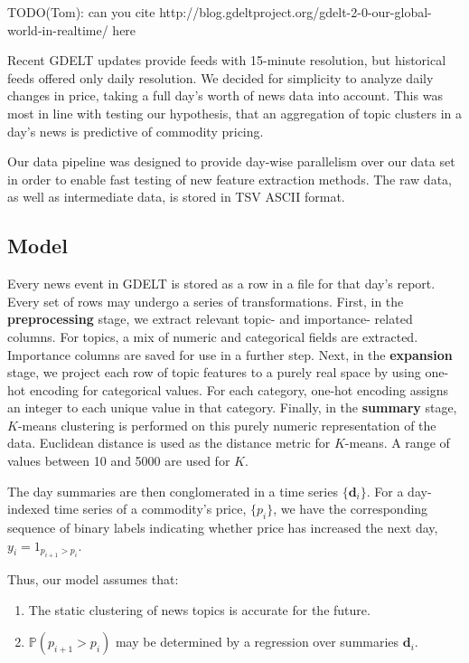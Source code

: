 TODO(Tom): can you cite http://blog.gdeltproject.org/gdelt-2-0-our-global-world-in-realtime/ here

Recent GDELT updates provide feeds with 15-minute resolution, but historical feeds offered only daily resolution. We decided for simplicity to analyze daily changes in price, taking a full day's worth of news data into account. This was most in line with testing our hypothesis, that an aggregation of topic clusters in a day's news is predictive of commodity pricing.

Our data pipeline was designed to provide day-wise parallelism over our data set in order to enable fast testing of new feature extraction methods. The raw data, as well as intermediate data, is stored in TSV ASCII format.

\subsection{Model}

Every news event in GDELT is stored as a row in a file for that day's report. Every set of rows may undergo a series of transformations. First, in the \textbf{preprocessing} stage, we extract relevant topic- and importance- related columns. For topics, a mix of numeric and categorical fields are extracted. Importance columns are saved for use in a further step. Next, in the \textbf{expansion} stage, we project each row of topic features to a purely real space by using one-hot encoding for categorical values. For each category, one-hot encoding assigns an integer to each unique value in that category. Finally, in the \textbf{summary} stage, $K$-means clustering is performed on this purely numeric representation of the data. Euclidean distance is used as the distance metric for $K$-means. A range of values between 10 and 5000 are used for $K$.

The day summaries are then conglomerated in a time series $\{\textbf{d}_i\}$. For a day-indexed time series of a commodity's price, $\{p_i\}$, we have the corresponding sequence of binary labels indicating whether price has increased the next day, $y_i=1_{p_{i+1}>p_i}$.

Thus, our model assumes that:
\begin{enumerate}
\item The static clustering of news topics is accurate for the future.
\item $\mathbb{P}(p_{i+1}>p_i)$ may be determined by a regression over summaries $\textbf{d}_i$. 
\end{enumerate}

